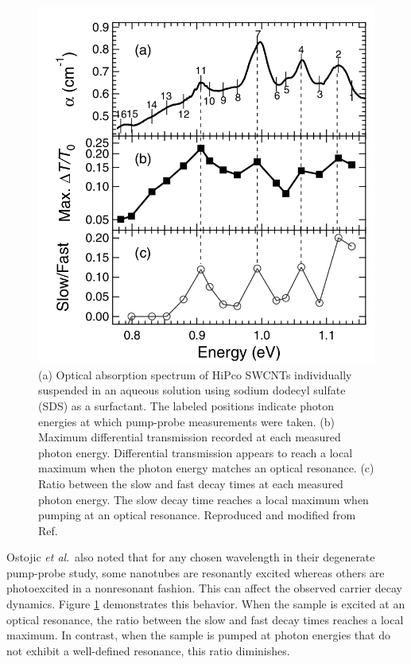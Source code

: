 \begin{figure}[ht]
	\centering
	\includegraphics[scale=0.3]{images/chapter_prior_works/wavelength_dependence_gordana}
	\caption{(a) Optical absorption spectrum of HiPco SWCNTs individually suspended in an aqueous solution using sodium dodecyl sulfate (SDS) as a surfactant. The labeled positions indicate photon energies at which pump-probe measurements were taken. (b) Maximum differential transmission recorded at each measured photon energy. Differential transmission appears to reach a local maximum when the photon energy matches an optical resonance. (c) Ratio between the slow and fast decay times at each measured photon energy. The slow decay time reaches a local maximum when pumping at an optical resonance. Reproduced and modified from Ref.\ \cite{ostojic2004interband}}
	\label{fig:wl_dep_gordana}
\end{figure}

Ostojic \textit{et al}.\  also noted that for any chosen wavelength in their degenerate pump-probe study, some nanotubes are resonantly excited whereas others are photoexcited in a nonresonant fashion. This can affect the observed carrier decay dynamics. Figure \ref{fig:wl_dep_gordana} demonstrates this behavior. When the sample is excited at an optical resonance, the ratio between the slow and fast decay times reaches a local maximum. In contrast, when the sample is pumped at photon energies that do not exhibit a well-defined resonance, this ratio diminishes.



